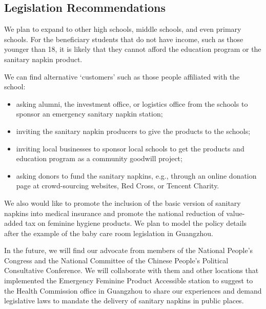\subsection{Legislation Recommendations}
We plan to expand to other high schools, middle schools, and even primary schools. For the beneficiary students that do not have income, such as those younger than 18, it is likely that they cannot afford the education program or the sanitary napkin product.

We can find alternative `customers' such as those people affiliated with the school:
\begin{itemize}
    \item asking alumni, the investment office, or logistics office from the schools to sponsor an emergency sanitary napkin station;
    \item inviting the sanitary napkin producers to give the products to the schools;
    \item inviting local businesses to sponsor local schools to get the products and education program as a community goodwill project;
    \item asking donors to fund the sanitary napkins, e.g., through an online donation page at crowd-sourcing websites, Red Cross, or Tencent Charity.
\end{itemize}

We also would like to promote the inclusion of the basic version of sanitary napkins into medical insurance and promote the national reduction of value-added tax on feminine hygiene products. We plan to model the policy details after the example of the baby care room legislation in Guangzhou.

In the future, we will find our advocate from members of the National People’s Congress and the National Committee of the Chinese People’s Political Consultative Conference. We will collaborate with them and other locations that implemented the Emergency Feminine Product Accessible station to suggest to the Health Commission office in Guangzhou to share our experiences and demand legislative laws to mandate the delivery of sanitary napkins in public places.
